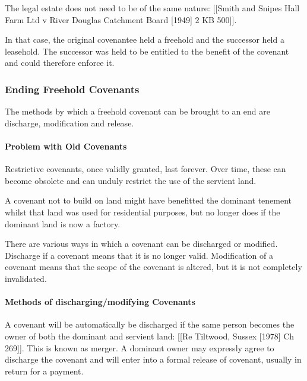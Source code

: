 \documentclass[
]{article}
\newenvironment{Shaded}{}{}
\newcommand{\NormalTok}[1]{#1}
\begin{document}
The legal estate does not need to be of the same nature: {[}{[}Smith and
Snipes Hall Farm Ltd v River Douglas Catchment Board {[}1949{]} 2 KB
500{]}{]}.

In that case, the original covenantee held a freehold and the successor
held a leasehold. The successor was held to be entitled to the benefit
of the covenant and could therefore enforce it.

\hypertarget{ending-freehold-covenants}{%
\subsubsection{Ending Freehold
Covenants}\label{ending-freehold-covenants}}

The methods by which a freehold covenant can be brought to an end are
discharge, modification and release.

\hypertarget{problem-with-old-covenants}{%
\paragraph{Problem with Old
Covenants}\label{problem-with-old-covenants}}

Restrictive covenants, once validly granted, last forever. Over time,
these can become obsolete and can unduly restrict the use of the
servient land.

\begin{Shaded}
\begin{Highlighting}[]
\NormalTok{A covenant not to build on land might have benefitted the dominant tenement whilst that land was used for residential purposes, but no longer does if the dominant land is now a factory.}
\end{Highlighting}
\end{Shaded}

There are various ways in which a covenant can be discharged or
modified. Discharge if a covenant means that it is no longer valid.
Modification of a covenant means that the scope of the covenant is
altered, but it is not completely invalidated.

\hypertarget{methods-of-dischargingmodifying-covenants}{%
\paragraph{Methods of discharging/modifying
Covenants}\label{methods-of-dischargingmodifying-covenants}}

A covenant will be automatically be discharged if the same person
becomes the owner of both the dominant and servient land: {[}{[}Re
Tiltwood, Sussex {[}1978{]} Ch 269{]}{]}. This is known as merger. A
dominant owner may expressly agree to discharge the covenant and will
enter into a formal release of covenant, usually in return for a
payment.
\end{document}
